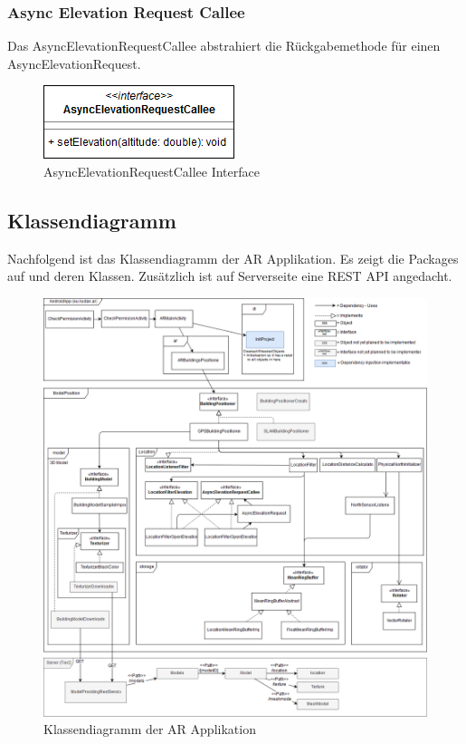 \documentclass[a4paper]{scrreprt}
\begin{document}
\subsubsection{Async Elevation Request Callee}
Das AsyncElevationRequestCallee abstrahiert die Rückgabemethode für einen AsyncElevationRequest.
\begin{figure}[h!]
	\center
	\includegraphics[scale=0.6]{AsyncElevationRequestCallee.png}
	\caption{AsyncElevationRequestCallee Interface}
\end{figure}

\subsection{Klassendiagramm}
Nachfolgend ist das Klassendiagramm der AR Applikation. Es zeigt die Packages auf und deren Klassen. Zusätzlich ist auf Serverseite eine REST API angedacht.

\begin{figure}[h!]
	\center
	\includegraphics[width=\textwidth]{Klassendiagramm.png}
	\caption{Klassendiagramm der AR Applikation}
\end{figure}
\end{document}

